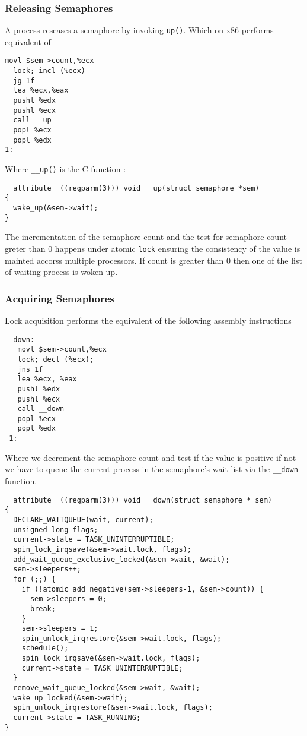 \documentclass{article}
\begin{document}

\subsubsection{Releasing Semaphores}

A process reseases a semaphore by invoking \lstinline{up()}. Which on
x86 performs equivalent of

\begin{lstlisting}[language=anX86]
  movl $sem->count,%ecx
  lock; incl (%ecx)
  jg 1f
  lea %ecx,%eax
  pushl %edx
  pushl %ecx
  call __up
  popl %ecx
  popl %edx
1:
\end{lstlisting}

Where \lstinline{__up()} is the C function :

\begin{lstlisting}
__attribute__((regparm(3))) void __up(struct semaphore *sem)
{
  wake_up(&sem->wait);
}  
\end{lstlisting}

The incrementation of the semaphore count and the test for semaphore
count greter than 0 happens under atomic \lstinline{lock} ensuring the
consistency of the value is mainted accorss multiple processors. If
count is greater than 0 then one of the list of waiting process is
woken up.


\subsubsection{Acquiring Semaphores}

Lock acquisition performs the equivalent of the following assembly
instructions


\begin{lstlisting}
  down:
   movl $sem->count,%ecx
   lock; decl (%ecx);
   jns 1f
   lea %ecx, %eax
   pushl %edx
   pushl %ecx
   call __down
   popl %ecx
   popl %edx
 1:
\end{lstlisting}

Where we decrement the semaphore count and test if the value is
positive if not we have to queue the current process in the
semaphore's wait list via the \lstinline{__down} function.

\begin{lstlisting}
__attribute__((regparm(3))) void __down(struct semaphore * sem)
{
  DECLARE_WAITQUEUE(wait, current);
  unsigned long flags;
  current->state = TASK_UNINTERRUPTIBLE;
  spin_lock_irqsave(&sem->wait.lock, flags);
  add_wait_queue_exclusive_locked(&sem->wait, &wait);
  sem->sleepers++;
  for (;;) {
    if (!atomic_add_negative(sem->sleepers-1, &sem->count)) {
      sem->sleepers = 0;
      break;
    }
    sem->sleepers = 1;
    spin_unlock_irqrestore(&sem->wait.lock, flags);
    schedule();
    spin_lock_irqsave(&sem->wait.lock, flags);
    current->state = TASK_UNINTERRUPTIBLE;
  }
  remove_wait_queue_locked(&sem->wait, &wait);
  wake_up_locked(&sem->wait);
  spin_unlock_irqrestore(&sem->wait.lock, flags);
  current->state = TASK_RUNNING;
}
\end{lstlisting}
\end{document}
